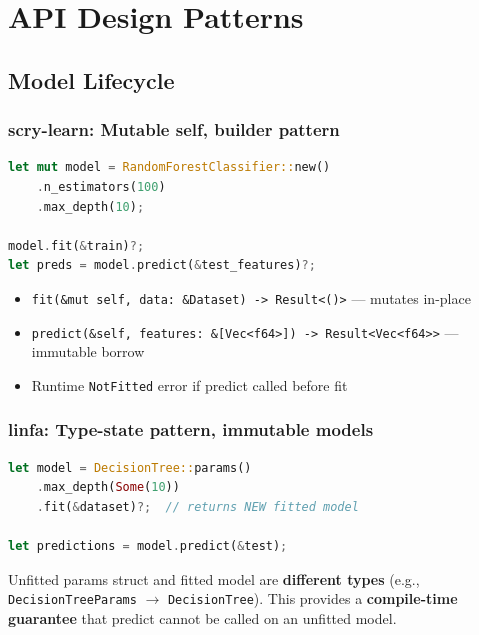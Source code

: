 \documentclass[11pt,a4paper]{article}
\begin{document}
\section{API Design Patterns}

\subsection{Model Lifecycle}

\subsubsection*{scry-learn: Mutable self, builder pattern}

\begin{lstlisting}[language=Rust]
let mut model = RandomForestClassifier::new()
    .n_estimators(100)
    .max_depth(10);

model.fit(&train)?;
let preds = model.predict(&test_features)?;
\end{lstlisting}

\begin{itemize}[itemsep=2pt]
\item \texttt{fit(\&mut self, data: \&Dataset) -> Result<()>} --- mutates in-place
\item \texttt{predict(\&self, features: \&[Vec<f64>]) -> Result<Vec<f64>{>}} --- immutable borrow
\item Runtime \texttt{NotFitted} error if predict called before fit
\end{itemize}

\subsubsection*{linfa: Type-state pattern, immutable models}

\begin{lstlisting}[language=Rust]
let model = DecisionTree::params()
    .max_depth(Some(10))
    .fit(&dataset)?;  // returns NEW fitted model

let predictions = model.predict(&test);
\end{lstlisting}

Unfitted params struct and fitted model are \textbf{different types} (e.g., \texttt{DecisionTreeParams} $\to$ \texttt{DecisionTree}). This provides a \textbf{compile-time guarantee} that predict cannot be called on an unfitted model.
\end{document}
